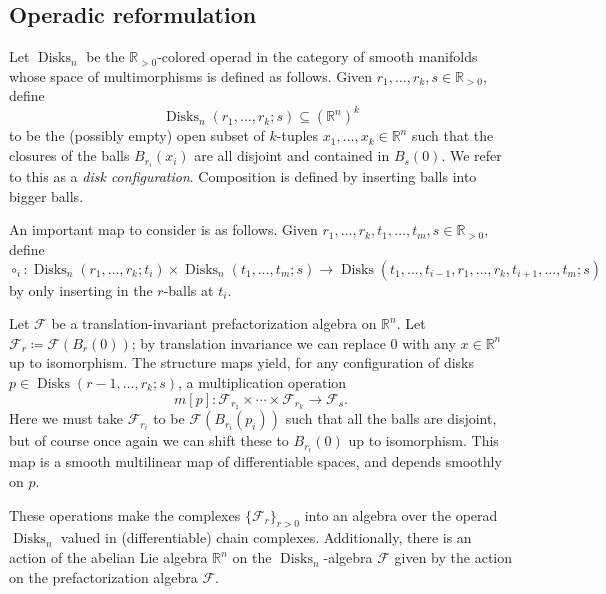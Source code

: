 \subsection{Operadic reformulation}

\begin{definition}\label{dfn:4-8-6}
	Let $\operatorname{Disks}_n$ be the $\mathbb{R} _{>0} $-colored operad in the category of smooth manifolds whose space of multimorphisms is defined as follows. Given $r_1, \ldots ,r_k,s\in\mathbb{R} _{>0} $, define
	\[
		\operatorname{Disks}_n(r_1, \ldots ,r_k ; s) \subseteq \left( \mathbb{R} ^n \right) ^k
	\]
	to be the (possibly empty) open subset of $k$-tuples $x_1, \ldots ,x_k\in\mathbb{R} ^n$ such that the closures of the balls $B_{r_i} (x_i)$ are all disjoint and contained in $B_s(0)$. We refer to this as a \emph{disk configuration}. Composition is defined by inserting balls into bigger balls.
\end{definition}

An important map to consider is as follows. Given $r_1, \ldots ,r_k, t_1, \ldots ,t_m,s\in\mathbb{R} _{>0} $, define
\[
	\circ _i : \operatorname{Disks}_n(r_1, \ldots ,r_k ; t_i) \times \operatorname{Disks}_n(t_1, \ldots ,t_m ; s)\to \operatorname{Disks} (t_1, \ldots ,t_{i-1} , r_1, \ldots ,r_k,t_{i+1} ,\ldots ,t_m ; s)
\]
by only inserting in the $r$-balls at $t_i$.

Let $\mathcal{F} $ be a translation-invariant prefactorization algebra on $\mathbb{R} ^n$. Let $\mathcal{F} _r \coloneqq \mathcal{F} (B_r(0))$; by translation invariance we can replace $0$ with any $x\in\mathbb{R} ^n$ up to isomorphism. The structure maps yield, for any configuration of disks $p\in \operatorname{Disks} (r-1, \ldots ,r_k ; s)$, a multiplication operation
\[
	m[p] : \mathcal{F} _{r_1} \times \cdots \times \mathcal{F} _{r_k}  \to \mathcal{F} _s
.\]
Here we must take $\mathcal{F} _{r_i} $ to be $\mathcal{F} (B_{r_i} (p_i))$ such that all the balls are disjoint, but of course once again we can shift these to $B_{r_i} (0)$ up to isomorphism. This map is a smooth multilinear map of differentiable spaces, and depends smoothly on $p$.

These operations make the complexes $\{\mathcal{F}_r\}_{r>0} $ into an algebra over the operad $\operatorname{Disks}_n$ valued in (differentiable) chain complexes. Additionally, there is an action of the abelian Lie algebra $\mathbb{R} ^n$ on the $\operatorname{Disks} _n$-algebra $\mathcal{F}$ given by the action on the prefactorization algebra $\mathcal{F} $.

